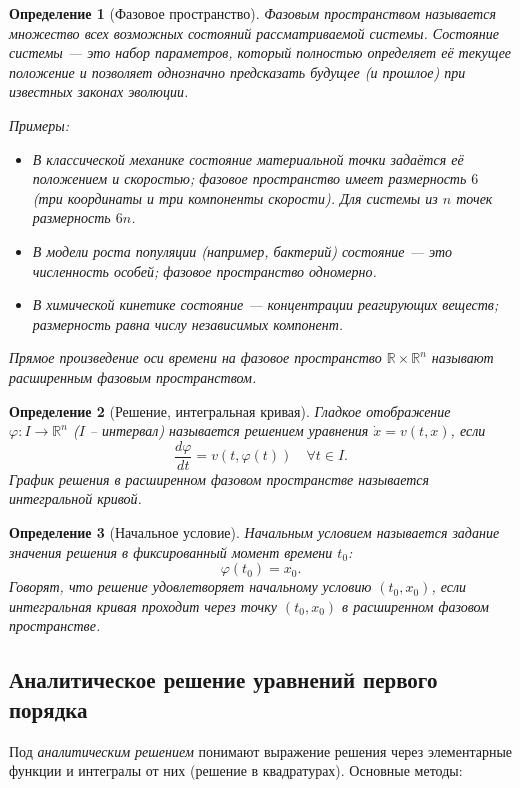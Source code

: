 \documentclass[a4paper,12pt]{article}
\newtheorem{definition}{Определение}
\theoremstyle{definition}
\begin{document}
\begin{definition}[Фазовое пространство]
	\emph{Фазовым пространством} называется множество всех возможных состояний рассматриваемой системы. Состояние системы — это набор параметров, который полностью определяет её текущее положение и позволяет однозначно предсказать будущее (и прошлое) при известных законах эволюции.
	
	\emph{Примеры:}
	\begin{itemize}
		\item В классической механике состояние материальной точки задаётся её положением и скоростью; фазовое пространство имеет размерность $6$ (три координаты и три компоненты скорости). Для системы из $n$ точек размерность $6n$.
		\item В модели роста популяции (например, бактерий) состояние — это численность особей; фазовое пространство одномерно.
		\item В химической кинетике состояние — концентрации реагирующих веществ; размерность равна числу независимых компонент.
	\end{itemize}
	Прямое произведение оси времени на фазовое пространство $\mathbb{R}\times\mathbb{R}^n$ называют \emph{расширенным фазовым пространством}.
\end{definition}

\begin{definition}[Решение, интегральная кривая]
	Гладкое отображение $\varphi:I\to\mathbb{R}^n$ ($I$ – интервал) называется \emph{решением} уравнения $\dot{x}=v(t,x)$, если
	\[
	\frac{d\varphi}{dt}=v(t,\varphi(t))\quad\forall t\in I.
	\]
	График решения в расширенном фазовом пространстве называется \emph{интегральной кривой}.
\end{definition}

\begin{definition}[Начальное условие]
	\emph{Начальным условием} называется задание значения решения в фиксированный момент времени $t_0$:
	\[
	\varphi(t_0)=x_0.
	\]
	Говорят, что решение удовлетворяет начальному условию $(t_0,x_0)$, если интегральная кривая проходит через точку $(t_0,x_0)$ в расширенном фазовом пространстве.
\end{definition}

\subsection{Аналитическое решение уравнений первого порядка}

Под \emph{аналитическим решением} понимают выражение решения через элементарные функции и интегралы от них (решение в квадратурах). Основные методы:
\end{document}

